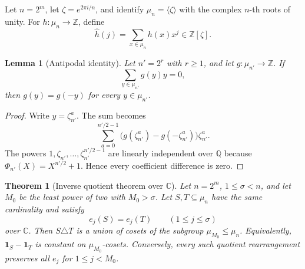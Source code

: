 \documentclass[11pt]{article}
\newtheorem{theorem}{Theorem}[section]
\newtheorem{lemma}[lemma]{Lemma}
\theoremstyle{definition}
\newcommand{\Z}{\mathbb Z}
\newcommand{\Q}{\mathbb Q}
\newcommand{\C}{\mathbb C}
\begin{document}
Let $n=2^m$, let $\zeta=e^{2\pi i/n}$, and identify $\mu_n=\langle\zeta\rangle$ with the complex $n$-th roots of unity.  For $h:\mu_n\to\Z$, define
\[
        \widehat h(j)=\sum_{x\in\mu_n}h(x)x^j\in\Z[\zeta].
\]

\begin{lemma}[Antipodal identity]\label{lem:antipodal}
Let $n'=2^r$ with $r\ge1$, and let $g:\mu_{n'}\to\Z$.  If
\[
        \sum_{y\in\mu_{n'}}g(y)y=0,
\]
then $g(y)=g(-y)$ for every $y\in\mu_{n'}$.
\end{lemma}

\begin{proof}
Write $y=\zeta_{n'}^a$.  The sum becomes
\[
        \sum_{a=0}^{n'/2-1}\big(g(\zeta_{n'}^a)-g(-\zeta_{n'}^a)\big)\zeta_{n'}^a.
\]
The powers $1,\zeta_{n'},\ldots,\zeta_{n'}^{n'/2-1}$ are linearly independent over $\Q$ because $\Phi_{n'}(X)=X^{n'/2}+1$.  Hence every coefficient difference is zero.
\end{proof}

\begin{theorem}[Inverse quotient theorem over $\C$]\label{thm:upstairs}
Let $n=2^m$, $1\le\sigma<n$, and let $M_0$ be the least power of two with $M_0>\sigma$.  Let $S,T\subseteq\mu_n$ have the same cardinality and satisfy
\[
        e_j(S)=e_j(T)\qquad(1\le j\le\sigma)
\]
over $\C$.  Then $S\triangle T$ is a union of cosets of the subgroup $\mu_{M_0}\le\mu_n$.  Equivalently, $\mathbf 1_S-\mathbf 1_T$ is constant on $\mu_{M_0}$-cosets.  Conversely, every such quotient rearrangement preserves all $e_j$ for $1\le j<M_0$.
\end{theorem}
\end{document}
